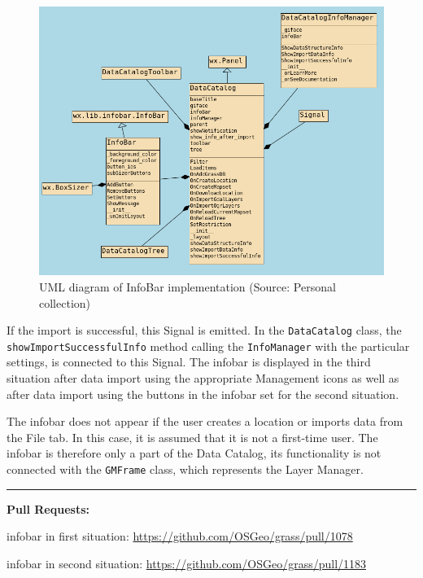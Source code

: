 \documentclass[a4paper,10pt,twoside]{article}
\begin{document}
\vspace{0.3cm}
\begin{figure}[hbt!] 
\begin{center}
\includegraphics[width=17cm]{../pictures/uml_chart.png} 
\caption[UML diagram of InfoBar implementation]{UML diagram of InfoBar implementation (Source: Personal collection)}
\label{fig:uml_chart}
\end{center}
\end{figure}

\noindent If the import is successful, this Signal is emitted. In the
\texttt{DataCatalog} class, the \texttt{showImportSuccessfulInfo}
method calling the \texttt{InfoManager} with the particular settings,
is connected to this Signal. The infobar is displayed in the third
situation after data import using the appropriate Management icons as
well as after data import using the buttons in the infobar set for
the second situation.

\newpage
\noindent The infobar does not appear if the user creates a location or imports
data from the File tab. In this case, it is assumed that it is not a
first-time user. The infobar is therefore only a part of the Data
Catalog, its functionality is not connected with the \texttt{GMFrame}
class, which represents the Layer Manager.

\par\noindent\rule{\textwidth}{0.4pt}
\noindent \textbf{Pull Requests:}

infobar in first situation: \url{https://github.com/OSGeo/grass/pull/1078}

infobar in second situation: \url{https://github.com/OSGeo/grass/pull/1183}
\end{document}
